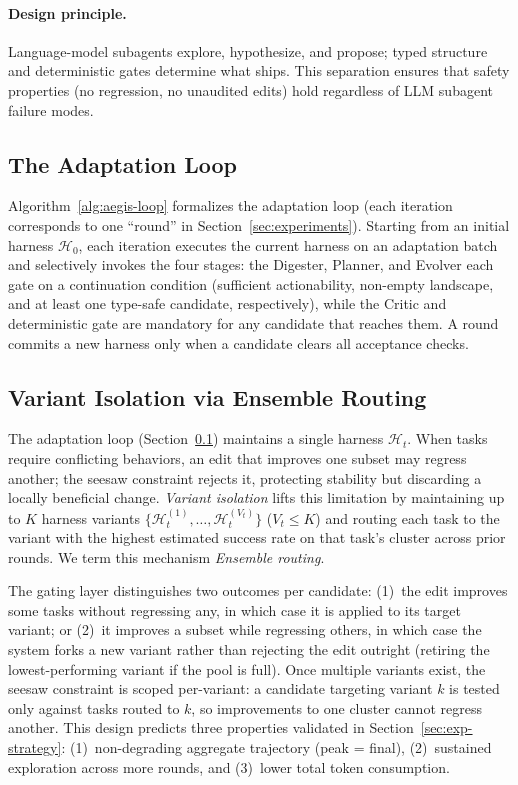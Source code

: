 \paragraph{Design principle.}
Language-model subagents explore, hypothesize, and propose; typed structure and deterministic gates determine what ships. This separation ensures that safety properties (no regression, no unaudited edits) hold regardless of LLM subagent failure modes.


\subsection{The Adaptation Loop}
\label{sec:aegis-loop}

Algorithm~\ref{alg:aegis-loop} formalizes the adaptation loop (each iteration corresponds to one ``round'' in Section~\ref{sec:experiments}). Starting from an initial harness $\mathcal{H}_0$, each iteration executes the current harness on an adaptation batch and selectively invokes the four stages: the Digester, Planner, and Evolver each gate on a continuation condition (sufficient actionability, non-empty landscape, and at least one type-safe candidate, respectively), while the Critic and deterministic gate are mandatory for any candidate that reaches them. A round commits a new harness only when a candidate clears all acceptance checks.



\subsection{Variant Isolation via Ensemble Routing}
\label{sec:aegis-ensemble}

The adaptation loop (Section~\ref{sec:aegis-loop}) maintains a single harness $\mathcal{H}_t$. When tasks require conflicting behaviors, an edit that improves one subset may regress another; the seesaw constraint rejects it, protecting stability but discarding a locally beneficial change. \textit{Variant isolation} lifts this limitation by maintaining up to $K$ harness variants $\{\mathcal{H}_t^{(1)}, \ldots, \mathcal{H}_t^{(V_t)}\}$ ($V_t \leq K$) and routing each task to the variant with the highest estimated success rate on that task's cluster across prior rounds. We term this mechanism \textit{Ensemble routing}.

The gating layer distinguishes two outcomes per candidate: (1)~the edit improves some tasks without regressing any, in which case it is applied to its target variant; or (2)~it improves a subset while regressing others, in which case the system forks a new variant rather than rejecting the edit outright (retiring the lowest-performing variant if the pool is full). Once multiple variants exist, the seesaw constraint is scoped per-variant: a candidate targeting variant $k$ is tested only against tasks routed to $k$, so improvements to one cluster cannot regress another. This design predicts three properties validated in Section~\ref{sec:exp-strategy}: (1)~non-degrading aggregate trajectory (peak = final), (2)~sustained exploration across more rounds, and (3)~lower total token consumption.


